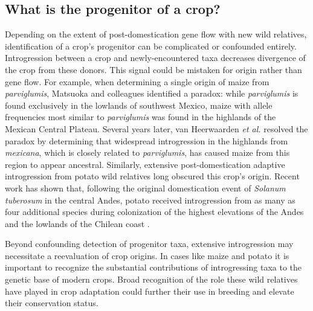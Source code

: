 \documentclass[11pt]{article}
\begin{document}
\subsection*{What is the progenitor of a crop?}
Depending on the extent of post-domestication gene flow with new wild relatives, identification of a crop's progenitor can be complicated or confounded entirely.
Introgression between a crop and newly-encountered taxa decreases divergence of the crop from these donors.
This signal could be mistaken for origin rather than gene flow.
For example, when determining a single origin of maize from \emph{parviglumis}, Matsuoka and colleagues \cite{matsuoka2002single} identified a paradox: while \emph{parviglumis} is found exclusively in the lowlands of southwest Mexico, maize with allele frequencies most similar to \emph{parviglumis} was found in the highlands of the Mexican Central Plateau.
Several years later, van Heerwaarden \emph{et al.} \cite{vanHeerwaarden2011} resolved the paradox by determining that widespread introgression in the highlands from \emph{mexicana}, which is closely related to \emph{parviglumis}, has caused maize from this region to appear ancestral.
Similarly, extensive post-domestication adaptive introgression from  potato wild relatives long obscured this crop's origin.
Recent work has shown that, following the original domestication event of \emph{Solanum tuberosum} in the central Andes, potato received introgression from as many as four additional species during colonization of the highest elevations of the Andes and the lowlands of the Chilean coast \cite{Spooner2014, Gavrilenko2013, Hardigan2017}.

Beyond confounding detection of progenitor taxa, extensive introgression may necessitate a reevaluation of crop origins.
In cases like maize and potato it is important to recognize the substantial contributions of introgressing taxa to the genetic base of modern crops.
Broad recognition of the role these wild relatives have played in crop adaptation could further their use in breeding and elevate their conservation status.
\end{document}
